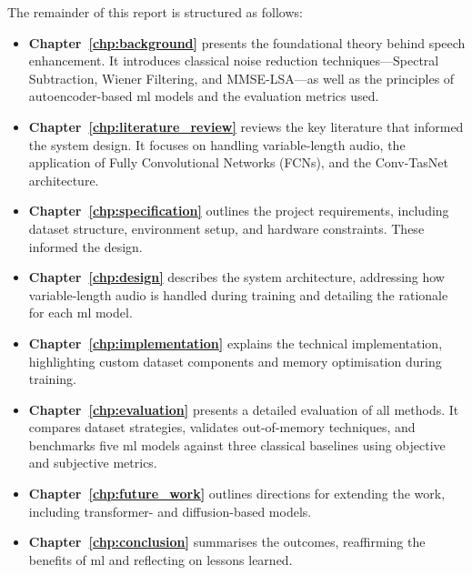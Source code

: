 The remainder of this report is structured as follows:
\begin{itemize}
    \item \textbf{Chapter~\ref{chp:background}} presents the foundational theory behind speech enhancement. It introduces classical noise reduction techniques—Spectral Subtraction, Wiener Filtering, and MMSE-LSA—as well as the principles of autoencoder-based \gls{ml} models and the evaluation metrics used.

    \item \textbf{Chapter~\ref{chp:literature_review}} reviews the key literature that informed the system design. It focuses on handling variable-length audio, the application of Fully Convolutional Networks (FCNs), and the Conv-TasNet architecture.

    \item \textbf{Chapter~\ref{chp:specification}} outlines the project requirements, including dataset structure, environment setup, and hardware constraints. These informed the design.

    \item \textbf{Chapter~\ref{chp:design}} describes the system architecture, addressing how variable-length audio is handled during training and detailing the rationale for each \gls{ml} model.

    \item \textbf{Chapter~\ref{chp:implementation}} explains the technical implementation, highlighting custom dataset components and memory optimisation during training.

    \item \textbf{Chapter~\ref{chp:evaluation}} presents a detailed evaluation of all methods. It compares dataset strategies, validates out-of-memory techniques, and benchmarks five \gls{ml} models against three classical baselines using objective and subjective metrics.

    \item \textbf{Chapter~\ref{chp:future_work}} outlines directions for extending the work, including transformer- and diffusion-based models.

    \item \textbf{Chapter~\ref{chp:conclusion}} summarises the outcomes, reaffirming the benefits of \gls{ml} and reflecting on lessons learned.
\end{itemize}
